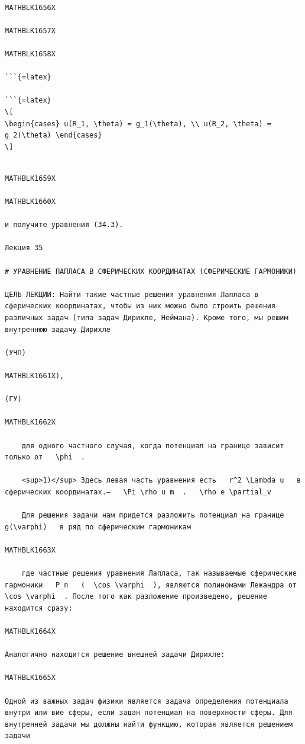 \documentclass[
]{article}
\begin{document}
\begin{verbatim}

MATHBLK1656X

MATHBLK1657X

MATHBLK1658X

```{=latex}

```{=latex}
\[
\begin{cases} u(R_1, \theta) = g_1(\theta), \\ u(R_2, \theta) = g_2(\theta) \end{cases}
\]
\end{verbatim}

\begin{verbatim}

MATHBLK1659X

MATHBLK1660X

и получите уравнения (34.3).

Лекция 35

# УРАВНЕНИЕ ПАПЛАСА В СФЕРИЧЕСКИХ КООРДИНАТАХ (СФЕРИЧЕСКИЕ ГАРМОНИКИ)

ЦЕЛЬ ЛЕКЦИИ: Найти такие частные решения уравнения Лапласа в сферических координатах, чтобы из них можно было строить решения различных задач (типа задач Дирихле, Неймана). Кроме того, мы решим внутреннюю задачу Дирихле

(УЧП)

MATHBLK1661X),

(ГУ)

MATHBLK1662X

    для одного частного случая, когда потенциал на границе зависит только от   \phi  .

    <sup>1)</sup> Здесь левая часть уравнения есть   r^2 \Lambda u   в сферических координатах.—   \Pi \rho u m  .   \rho e \partial_v 

    Для решения задачи нам придется разложить потенциал на границе   g(\varphi)   в ряд по сферическим гармоникам

MATHBLK1663X

    где частные решения уравнения Лапласа, так называемые сферические гармоники   P_n   (  \cos \varphi  ), являются полиномами Лежандра от   \cos \varphi  . После того как разложение произведено, решение находится сразу:

MATHBLK1664X

Аналогично находится решение внешней задачи Дирихле:

MATHBLK1665X

Одной из важных задач физики является задача определения потенциала внутри или вие сферы, если задан потенциал на поверхности сферы. Для внутренней задачи мы должны найти функцию, которая является решением задачи


\end{verbatim}
\end{document}
